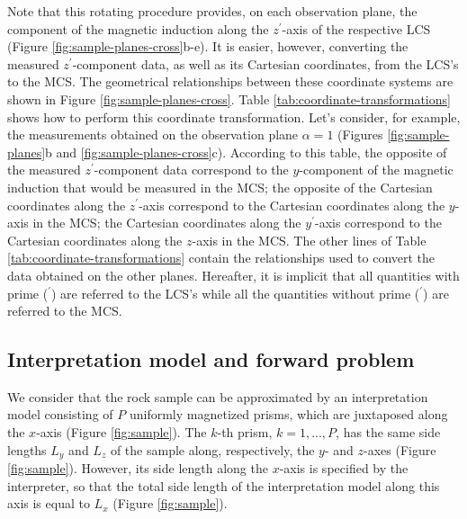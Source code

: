\documentclass[draft,gc]{agutex}
\begin{document}
\begin{article}
Note that this rotating procedure provides, on each observation plane, 
the component of the magnetic induction along the $z^{\prime}$-axis
of the respective LCS (Figure \ref{fig:sample-planes-cross}b-e).
It is easier, however, converting the measured $z^{\prime}$-component
data, as well as its Cartesian coordinates, from the LCS's to the MCS.
The geometrical relationships between these coordinate systems are
shown in Figure \ref{fig:sample-planes-cross}.
Table \ref{tab:coordinate-transformations} shows how to perform
this coordinate transformation. Let's consider, for example, the measurements 
obtained on the observation plane $\alpha = 1$ (Figures \ref{fig:sample-planes}b
and \ref{fig:sample-planes-cross}c). According to this table, 
the opposite of the measured $z^{\prime}$-component data correspond to the 
$y$-component of the magnetic induction that would be measured in the MCS;
the opposite of the Cartesian coordinates along the $z^{\prime}$-axis
correspond to the Cartesian coordinates along the $y$-axis in the MCS;
the Cartesian coordinates along the $y^{\prime}$-axis
correspond to the Cartesian coordinates along the $z$-axis in the MCS. 
The other lines of Table \ref{tab:coordinate-transformations} contain
the relationships used to convert the data obtained on the other planes.
Hereafter, it is implicit that all quantities with prime ($^{\prime}$) 
are referred to the LCS's while all the quantities without prime 
($^{\prime}$) are referred to the MCS.

\subsection{Interpretation model and forward problem}
\label{subsec:Interpretation model and forward problem}

We consider that the rock sample can be approximated by an 
interpretation model consisting of $P$ uniformly magnetized 
prisms, which are juxtaposed along the $x$-axis  
(Figure \ref{fig:sample}). The $k$-th prism, $k = 1, ..., P$, 
has the same side lengths $L_{y}$ and $L_{z}$ of the sample along, 
respectively, the $y$- and $z$-axes (Figure \ref{fig:sample}). 
However, its side length along the $x$-axis is specified by the 
interpreter, so that the total side length of the interpretation 
model along this axis is equal to $L_{x}$ (Figure \ref{fig:sample}).


\end{article}
\end{document}
